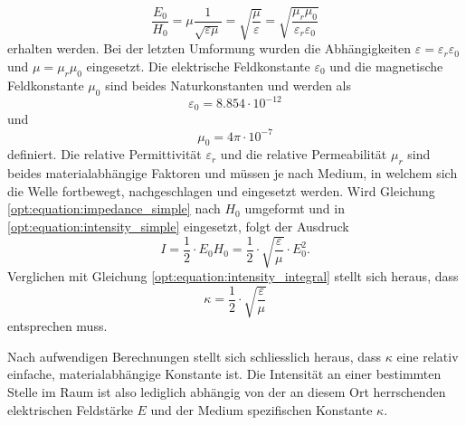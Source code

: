 \begin{equation}
\frac{E_0}{H_0}
=
\mu \frac{1}{\sqrt{\varepsilon\mu}}
=
\sqrt{\frac{\mu}{\varepsilon}}
=
\sqrt{\frac{\mu_r\mu_0}{\varepsilon_r\varepsilon_0}}
\label{opt:equation:impedance_simple}
\end{equation}
erhalten werden.
Bei der letzten Umformung wurden die Abhängigkeiten $\varepsilon = \varepsilon_r \varepsilon_0$ und $\mu = \mu_r \mu_0$ eingesetzt.
Die elektrische Feldkonstante $\varepsilon_0$ und die magnetische Feldkonstante $\mu_0$ sind beides Naturkonstanten und werden als
\begin{equation*}
\varepsilon_0
=
8.854 \cdot 10^{-12}
\end{equation*}
und
\begin{equation*}
\mu_0
=
4\pi \cdot 10^{-7}
\end{equation*}
definiert.
Die relative Permittivität $\varepsilon_r$ und die relative Permeabilität $\mu_r$ sind beides materialabhängige Faktoren und müssen je nach Medium, in welchem sich die Welle fortbewegt, nachgeschlagen und eingesetzt werden.
Wird Gleichung \eqref{opt:equation:impedance_simple} nach $H_0$ umgeformt und in \eqref{opt:equation:intensity_simple} eingesetzt, folgt der Ausdruck
\begin{equation*}
I
=
\frac{1}{2} \cdot E_0 H_0
=
\frac{1}{2} \cdot \sqrt{\frac{\varepsilon}{\mu}} \cdot E_0^2
.
\end{equation*}
Verglichen mit Gleichung \eqref{opt:equation:intensity_integral} stellt sich heraus, dass
\begin{equation*}
\kappa
=
\frac{1}{2} \cdot \sqrt{\frac{\varepsilon}{\mu}}
\end{equation*}
entsprechen muss.

Nach aufwendigen Berechnungen stellt sich schliesslich heraus, dass $\kappa$ eine relativ einfache, materialabhängige Konstante ist.
Die Intensität an einer bestimmten Stelle im Raum ist also lediglich abhängig von der an diesem Ort herrschenden elektrischen Feldstärke $E$ und der Medium spezifischen Konstante $\kappa$.


